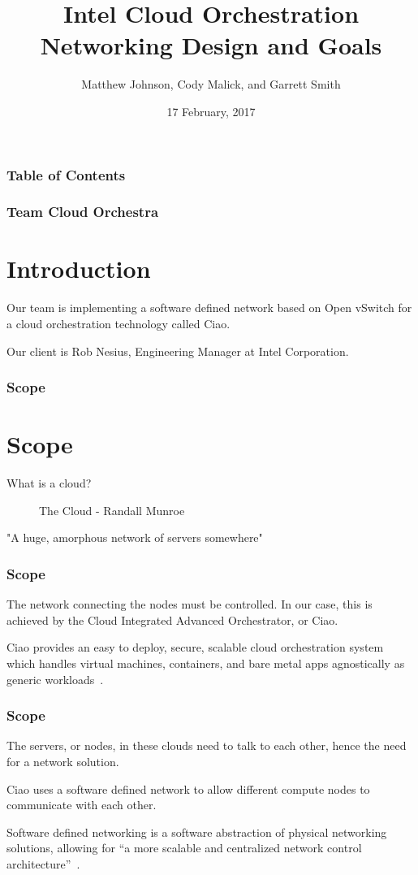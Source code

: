 \documentclass[pdf]{beamer}
\begin{document}
\title{Intel Cloud Orchestration Networking Design and Goals}
\author{Matthew Johnson, Cody Malick, and Garrett Smith}
\date{17 February, 2017}

\maketitle
\begin{frame}
	\frametitle{Table of Contents}
	\tableofcontents
\end{frame}

\begin{frame}
	\frametitle{Team Cloud Orchestra}
	\section{Introduction}
	Our team is implementing a software defined network based on Open
	vSwitch for a cloud orchestration technology called Ciao.

	Our client is Rob Nesius, Engineering Manager at Intel Corporation.
\end{frame}

\begin{frame}
	\frametitle{Scope}
	\section{Scope}
	What is a cloud?
	\begin{figure}[H]
		\caption{The Cloud - Randall Munroe~\cite{xkcd908}}
		\begin{center}
		\end{center}
	\end{figure}

	"A huge, amorphous network of servers somewhere"

\end{frame}

\begin{frame}
	\frametitle{Scope}
	The network connecting the nodes must be controlled. In our case, this
	is achieved by the Cloud Integrated Advanced Orchestrator, or Ciao.

	Ciao provides an easy to deploy, secure, scalable cloud orchestration
	system which handles virtual machines, containers, and bare metal apps
	agnostically as generic workloads~\cite{ciao}.
\end{frame}

\begin{frame}
	\frametitle{Scope}
	The servers, or nodes, in these clouds need to talk to each other, hence
	the need for a network solution.

	Ciao uses a software defined network to allow different compute nodes to
	communicate with each other.

	Software defined networking is a software abstraction of physical
	networking solutions, allowing for ``a more scalable and centralized
	network control architecture''~\cite{goransson}.
\end{frame}
\end{document}
